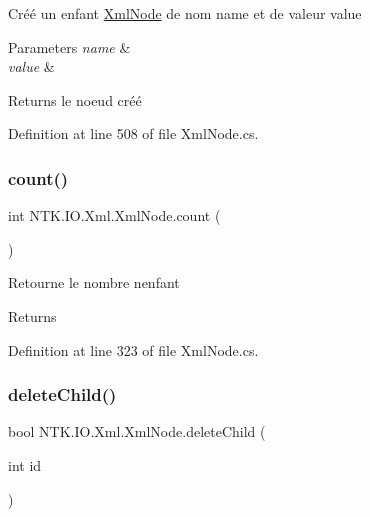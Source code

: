 Créé un enfant \mbox{\hyperlink{class_n_t_k_1_1_i_o_1_1_xml_1_1_xml_node}{Xml\+Node}} de nom name et de valeur value 


\begin{DoxyParams}{Parameters}
{\em name} & \\
\hline
{\em value} & \\
\hline
\end{DoxyParams}
\begin{DoxyReturn}{Returns}
le noeud créé
\end{DoxyReturn}


Definition at line 508 of file Xml\+Node.\+cs.

\mbox{\label{class_n_t_k_1_1_i_o_1_1_xml_1_1_xml_node_abbdcf78ce42cca075453c38842d1db54}} 
\subsubsection{\texorpdfstring{count()}{count()}}
{\footnotesize\ttfamily int N\+T\+K.\+I\+O.\+Xml.\+Xml\+Node.\+count (\begin{DoxyParamCaption}{ }\end{DoxyParamCaption})}



Retourne le nombre n\textquotesingle{}enfant 

\begin{DoxyReturn}{Returns}

\end{DoxyReturn}


Definition at line 323 of file Xml\+Node.\+cs.

\mbox{\label{class_n_t_k_1_1_i_o_1_1_xml_1_1_xml_node_ae22a0c9309de6208e60d442c21d83ff3}} 
\subsubsection{\texorpdfstring{deleteChild()}{deleteChild()}\hspace{0.1cm}{\footnotesize\ttfamily [1/2]}}
{\footnotesize\ttfamily bool N\+T\+K.\+I\+O.\+Xml.\+Xml\+Node.\+delete\+Child (\begin{DoxyParamCaption}\item[{int}]{id }\end{DoxyParamCaption})}



